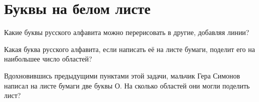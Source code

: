 \section{Буквы на белом листе}
\begin{itemize}

\itA Какие буквы русского алфавита можно перерисовать в другие, добавляя линии?

\itB Какая буква русского алфавита, если написать её на листе бумаги, поделит его на наибольшее число областей?

\itC Вдохновившись предыдущими пунктами этой задачи, мальчик Гера Симонов написал на листе бумаги две буквы О. На сколько областей они могли поделить лист?
\end{itemize}